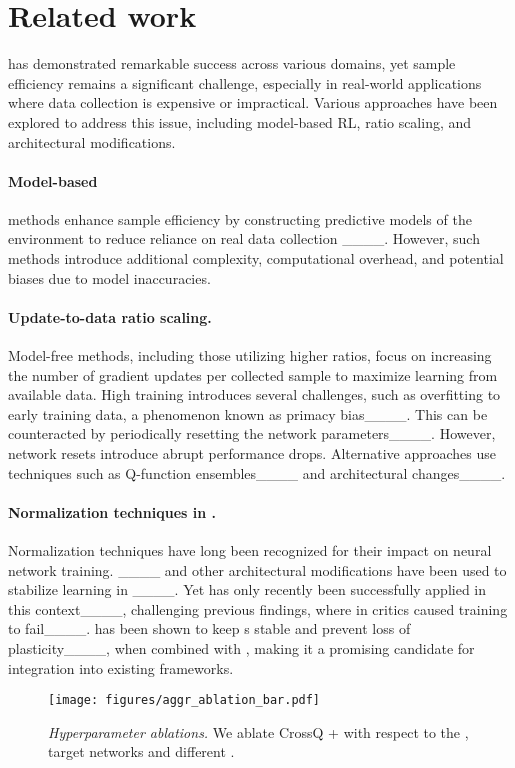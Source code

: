 \section{Related work}
\RL{} has demonstrated remarkable success across various domains, yet sample efficiency remains a significant challenge, especially in real-world applications where data collection is expensive or impractical. Various approaches have been explored to address this issue, including model-based RL, \UTD{} ratio scaling, and architectural modifications.

\paragraph{Model-based \RL{}} methods enhance sample efficiency by constructing predictive models of the environment to reduce reliance on real data collection ____.
However, such methods introduce additional complexity, computational overhead, and potential biases due to model inaccuracies.

\paragraph{Update-to-data ratio scaling.}
Model-free \RL{} methods, including those utilizing higher \UTD{} ratios, focus on increasing the number of gradient updates per collected sample to maximize learning from available data.
High \UTD{} training introduces several challenges, such as overfitting to early training data, a phenomenon known as primacy bias____.
This can be counteracted by periodically resetting the network parameters____.
However, network resets introduce abrupt performance drops.
Alternative approaches use techniques such as Q-function ensembles____ and architectural changes____.

\paragraph{Normalization techniques in \RL{}.}
Normalization techniques have long been recognized for their impact on neural network training. \LN{}____ and other architectural modifications have been used to stabilize learning in \RL{}____.
Yet \BN{} has only recently been successfully applied in this context____, challenging previous findings, where \BN{} in critics caused training to fail____.
\WN{} has been shown to keep \ELR{}s stable and prevent loss of plasticity____, when combined with \LN{}, making it a promising candidate for integration into existing \RL{} frameworks.

\begin{figure}[t]
    \centering
    \texttt{[image: figures/aggr\_ablation\_bar.pdf]}
    \caption{\textit{Hyperparameter ablations.}
    We ablate CrossQ + \WN{} with respect to the \WN{}, target networks and different \UTD.
    }
    \label{fig:ablations}
\end{figure}